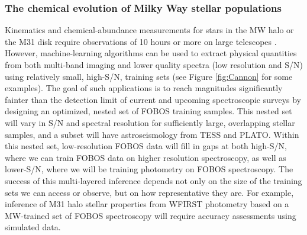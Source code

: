 \subsubsection{The chemical evolution of Milky Way stellar
populations} Kinematics and chemical-abundance measurements for stars
in the MW halo or the M31 disk require observations of 10 hours or
more on large telescopes \citep[e.g.,][]{2018arXiv180904082C}.
However, machine-learning algorithms can be used to extract physical
quantities from both multi-band imaging and lower quality spectra
(low resolution and S/N) using relatively small, high-S/N, training
sets (see Figure \ref{fig:Cannon} for some examples). The goal of
such applications is to reach magnitudes significantly fainter than
the detection limit of current and upcoming spectroscopic surveys by
designing an optimized, nested set of FOBOS training samples. This
nested set will vary in S/N and spectral resolution for sufficiently
large, overlapping stellar samples, and a subset will have
astroseismology from TESS and PLATO. Within this nested set,
low-resolution FOBOS data will fill in gaps at both high-S/N, where
we can train FOBOS data on higher resolution spectroscopy, as well as
lower-S/N, where we will be training photometry on FOBOS
spectroscopy. The success of this multi-layered inference depends not
only on the size of the training sets we can access or observe, but
on how representative they are. For example, inference of M31 halo
stellar properties from WFIRST photometry based on a MW-trained set
of FOBOS spectroscopy will require accuracy assessments using
simulated data.



